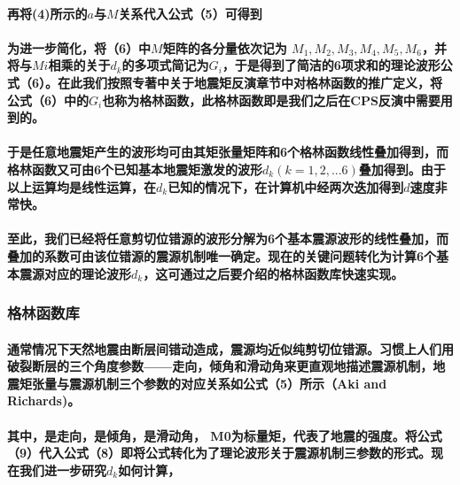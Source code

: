 \documentclass[a4paper,12pt,single,pdftex]{scrartcl}
\begin{document}
\label{ID_362828610}\paragraph{再将(4)所示的$a$与$M$关系代入公式（5）可得到}

\label{ID_1164082214}\paragraph{为进一步简化，将（6）中$M$矩阵的各分量依次记为 $M_1,M_2,M_3,M_4,M_5,M_6$，并将与$Mi$相乘的关于$d_k$的多项式简记为$G_i$，于是得到了简洁的6项求和的理论波形公式（6）。在此我们按照\citet{Stein2003}专著中关于地震矩反演章节中对格林函数的推广定义，将公式（6）中的$G_i$也称为格林函数，此格林函数即是我们之后在CPS反演中需要用到的。}

\label{ID_1125175989}\paragraph{于是任意地震矩产生的波形均可由其矩张量矩阵和6个格林函数线性叠加得到，而格林函数又可由6个已知基本地震矩激发的波形$d_k(k=1,2,...6)$叠加得到。由于以上运算均是线性运算，在$d_k$已知的情况下，在计算机中经两次迭加得到$d$速度非常快。}

\label{ID_1890175740}\paragraph{至此，我们已经将任意剪切位错源的波形分解为6个基本震源波形的线性叠加，而叠加的系数可由该位错源的震源机制唯一确定。现在的关键问题转化为计算6个基本震源对应的理论波形$d_k$，这可通过之后要介绍的格林函数库快速实现。}

\label{ID_1740220633}\subsubsection{格林函数库}

\label{ID_100364337}\paragraph{通常情况下天然地震由断层间错动造成，震源均近似纯剪切位错源。习惯上人们用破裂断层的三个角度参数——走向，倾角和滑动角来更直观地描述震源机制，地震矩张量与震源机制三个参数的对应关系如公式（5）所示（Aki and Richards)。}

\label{ID_650574393}\paragraph{其中，是走向，是倾角，是滑动角， M0为标量矩，代表了地震的强度。将公式（9）代入公式（8）即将公式转化为了理论波形关于震源机制三参数的形式。现在我们进一步研究$d_k$如何计算，}
\end{document}
